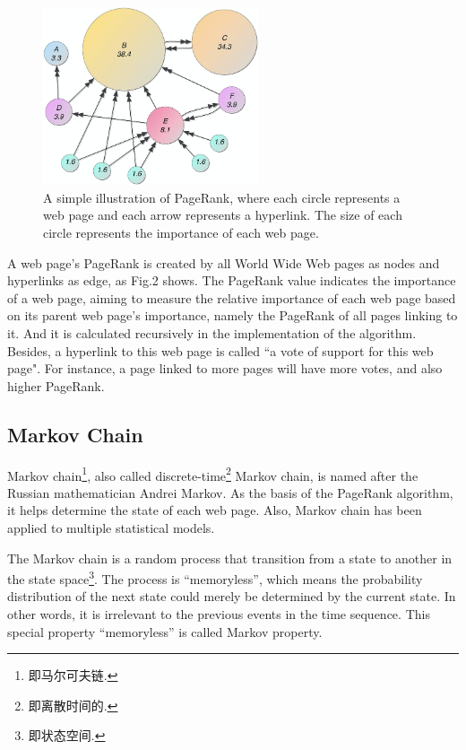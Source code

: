 \documentclass[lettersize,journal,12pt,conference]{IEEEtran}
\begin{document}
\begin{figure}[h]
    \centering
    \includegraphics[width=2.5in]{images/fig3.jpeg}
    \caption{A simple illustration of PageRank, where each circle represents a web page and each arrow represents a hyperlink. The size of each circle represents the importance of each web page.}
    \label{fig3}
\end{figure}

A web page's PageRank is created by all World Wide Web pages as nodes and hyperlinks as edge, as Fig.2 shows. The PageRank value indicates the importance of a web page, aiming to measure the relative importance of each web page based on its parent web page's importance, namely the PageRank of all pages linking to it. And it is calculated recursively in the implementation of the algorithm. Besides, a hyperlink to this web page is called ``a vote of support for this web page". For instance, a page linked to more pages will have more votes, and also higher PageRank. 

\subsection{Markov Chain}

Markov chain\footnote[1]{即马尔可夫链.}, also called discrete-time\footnote[2]{即离散时间的.} Markov chain, is named after the Russian mathematician Andrei Markov. As the basis of the PageRank algorithm, it helps determine the state of each web page. Also, Markov chain has been applied to multiple statistical models.

The Markov chain is a random process that transition from a state to another in the state space\footnote[3]{即状态空间.}. The process is ``memoryless'', which means the probability distribution of the next state could merely be determined by the current state. In other words, it is irrelevant to the previous events in the time sequence. This special property ``memoryless'' is called Markov property. 
\end{document}
